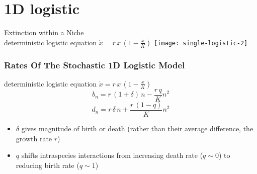 \documentclass[dvipsnames]{beamer}
\begin{document}
\section[Extinction]{1D logistic}

\begin{frame}
\centering
{{\Huge Extinction within a Niche\\}}
\normalsize{}
\vspace{1cm}
deterministic logistic equation $\dot{x} = r \, x \, \left(1-\frac{x}{K}\right)$
\texttt{[image: single-logistic-2]}
\end{frame}


\begin{frame}
\frametitle{Rates Of The Stochastic 1D Logistic Model}
\centering
deterministic logistic equation $\dot{x} = r \, x \, \left(1-\frac{x}{K}\right)$
\begin{equation*}
b_n = r\,(1 + \delta)\,n - \frac{r\,q}{K}n^2%
\end{equation*}
\begin{equation*}
d_n = r\,\delta\,n + \frac{r\,(1-q)}{K} n^2%
\end{equation*}
\vspace{-0.2cm}
\pause
\begin{itemize}
\item $\delta$ gives magnitude of birth or death (rather than their average difference, the growth rate $r$)
\item $q$ shifts intraspecies interactions from increasing death rate ($q \sim 0$) to reducing birth rate ($q \sim 1$)
\end{itemize}
\end{frame}
\end{document}
